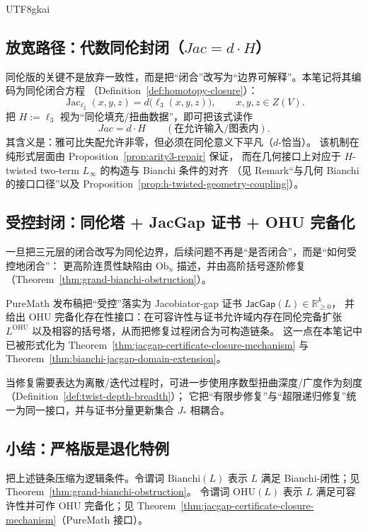 \documentclass[12pt]{article}
\newcommand{\Layer}{\ensuremath{\ell}}
\newcommand{\Jac}{\operatorname{Jac}}
\newcommand{\Ob}{\mathrm{Ob}}
\newcommand{\JacGap}{\ensuremath{\mathsf{JacGap}}}
\begin{document}
\begin{CJK*}{UTF8}{gkai}
\subsection{放宽路径：代数同伦封闭（$Jac=d\cdot H$）}

同伦版的关键不是放弃一致性，而是把“闭合”改写为“边界可解释”。本笔记将其编码为同伦闭合方程
（Definition~\ref{def:homotopy-closure}）：
\[
  \Jac_{\Layer_2}(x,y,z)=d\bigl(\Layer_3(x,y,z)\bigr),\qquad x,y,z\in Z(V).
\]
把 $H:=\Layer_3$ 视为“同伦填充/扭曲数据”，即可把该式读作
\[
  Jac = d\cdot H
  \qquad (\text{在允许输入/图表内}).
\]
其含义是：雅可比失配允许非零，但必须在同伦意义下平凡（$d$-恰当）。
该机制在纯形式层面由 Proposition~\ref{prop:arity3-repair} 保证，
而在几何接口上对应于 $H$-twisted two-term $L_\infty$ 的构造与 Bianchi 条件的对齐
（见 Remark“与几何 Bianchi 的接口口径”以及 Proposition~\ref{prop:h-twisted-geometry-coupling}）。\cite{GaoZheng2025GFramework}

\subsection{受控封闭：同伦塔 + JacGap 证书 + OHU 完备化}

一旦把三元层的闭合改写为同伦边界，后续问题不再是“是否闭合”，而是“如何受控地闭合”：
更高阶连贯性缺陷由 $\Ob_n$ 描述，并由高阶括号逐阶修复（Theorem~\ref{thm:grand-bianchi-obstruction}）。

PureMath 发布稿把“受控”落实为 Jacobiator-gap 证书 $\JacGap(L)\in\mathbb{R}_{\ge0}^k$，
并给出 OHU 完备化存在性接口：在可容许性与证书允许域内存在同伦完备扩张 $L^{\mathrm{OHU}}$
以及相容的括号塔，从而把修复过程闭合为可构造链条。\cite{GaoZheng2025GFramework}
这一点在本笔记中已被形式化为 Theorem~\ref{thm:jacgap-certificate-closure-mechanism}
与 Theorem~\ref{thm:bianchi-jacgap-domain-extension}。

当修复需要表达为离散/迭代过程时，可进一步使用序数型扭曲深度/广度作为刻度（Definition~\ref{def:twist-depth-breadth}）；
它把“有限步修复”与“超限递归修复”统一为同一接口，并与证书分量更新集合 $J_\ast$ 相耦合。\cite{JacGapDStructureEquiv}

\subsection{小结：严格版是退化特例}

把上述链条压缩为逻辑条件。令谓词 $\mathrm{Bianchi}(L)$ 表示 $L$ 满足 Bianchi-闭性；见 Theorem~\ref{thm:grand-bianchi-obstruction}。
令谓词 $\mathrm{OHU}(L)$ 表示 $L$ 满足可容许性并可作 OHU 完备化；见 Theorem~\ref{thm:jacgap-certificate-closure-mechanism}（PureMath 接口）。


\end{CJK*}
\end{document}
